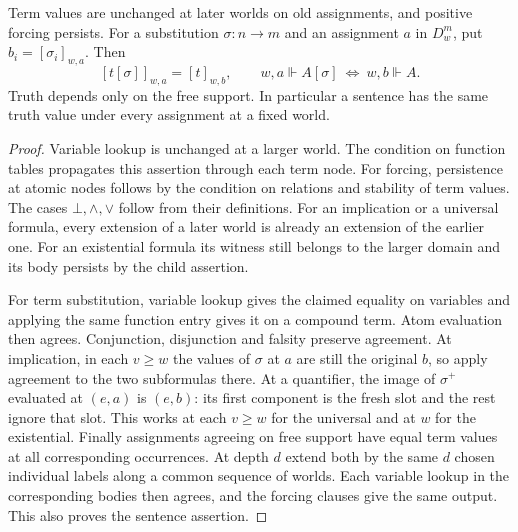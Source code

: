 \begin{lemma}\label{lem:krip-sub}
Term values are unchanged at later worlds on old assignments, and positive
forcing persists. For a substitution $\sigma:n\to m$ and an assignment
$a$ in $D_w^m$, put $b_i=[\sigma_i]_{w,a}$. Then
\[
  [t[\sigma]]_{w,a}=[t]_{w,b},\qquad
  w,a\Vdash A[\sigma]\ \Longleftrightarrow\ w,b\Vdash A.
\]
Truth depends only on the free support. In particular a sentence has the
same truth value under every assignment at a fixed world.
\end{lemma}
\begin{proof}
Variable lookup is unchanged at a larger world. The condition on
function tables propagates this assertion through each term node. For
forcing, persistence at atomic nodes follows by the condition on relations
and stability of term values. The cases $\bot,\wedge,\vee$ follow from their
definitions. For an implication or a universal formula, every extension
of a later world is already an extension of the earlier one. For an
existential formula its witness still belongs to the larger domain
and its body persists by the child assertion.

For term substitution, variable lookup gives the claimed equality on
variables and applying the same function entry gives it on a compound
term. Atom evaluation then agrees. Conjunction, disjunction and falsity
preserve agreement. At implication, in each $v\ge w$ the values of
$\sigma$ at $a$ are still the original $b$, so apply agreement to the
two subformulas there. At a quantifier, the image of $\sigma^+$ evaluated
at $(e,a)$ is $(e,b)$: its first component is the fresh slot and the
rest ignore that slot. This works at each $v\ge w$ for the universal
and at $w$ for the existential. Finally assignments agreeing on free
support have equal term values at all corresponding occurrences.
At depth $d$ extend both by the same $d$ chosen individual labels
along a common sequence of worlds. Each variable lookup in the
corresponding bodies then agrees, and the forcing clauses give the
same output. This also proves the sentence assertion.
\end{proof}

